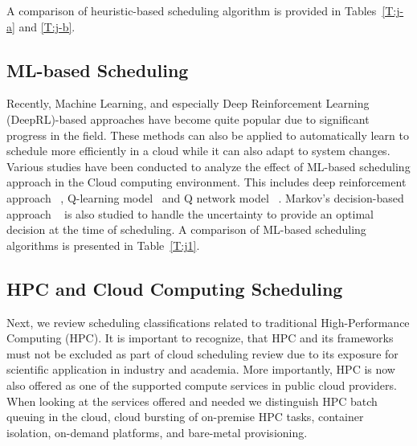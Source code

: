 \documentclass[final,5p,times,twocolumn]{elsarticle}
\begin{document}
A comparison of heuristic-based scheduling algorithm is provided in
Tables~\ref{T:j-a} and \ref{T:j-b}.

%


\subsection{ML-based Scheduling}\label{sec:AI}

Recently, Machine Learning, and especially Deep Reinforcement Learning (DeepRL)-based approaches have become quite popular due to significant progress in the field. These methods can also be applied to automatically learn to schedule more efficiently in a cloud while it can also adapt to system changes. Various studies have been conducted to analyze the effect of ML-based scheduling approach in the Cloud computing environment. This includes deep reinforcement approach ~\cite{cheng2018drl,mao2018learning}, Q-learning model~\cite{zhang2017energy} and Q network model ~\cite{wang2019multi}. Markov's decision-based approach ~\cite{barrett2013applying} is also studied to handle the uncertainty to provide an optimal decision at the time of scheduling. A comparison of ML-based scheduling algorithms is presented in Table~\ref{T:j1}.

%



\subsection{HPC and Cloud Computing Scheduling}
\label{sec:hpc}


Next, we review scheduling classifications related to traditional High-Performance Computing (HPC). It is important to recognize, that HPC and its frameworks must not be excluded as part of cloud scheduling review due to its exposure for scientific application in industry and academia. More importantly, HPC is now also offered as one of the supported compute services in public cloud providers. When looking at the services offered and needed we distinguish HPC batch queuing in the cloud, cloud bursting of on-premise HPC tasks, container isolation, on-demand platforms, and bare-metal provisioning.
\end{document}

